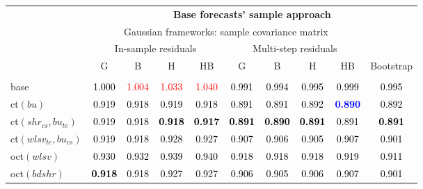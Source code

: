 
\begin{tabular}[t]{>{\centering\arraybackslash}m{2.5cm}ccccccccc}
\toprule
\multicolumn{1}{c}{\textbf{}} & \multicolumn{9}{c}{\textbf{Base forecasts' sample approach}} \\
\cmidrule(l{0pt}r{0pt}){2-10}
\multicolumn{1}{c}{} & \multicolumn{8}{c}{Gaussian frameworks: sample covariance matrix} & \multicolumn{1}{c}{} \\
\multicolumn{1}{c}{} & \multicolumn{4}{c}{In-sample residuals} & \multicolumn{4}{c}{Multi-step residuals} & \multicolumn{1}{c}{} \\
\multirow{-5}{*}{\parbox{2cm}{\centering\textbf{Reconciliation\\approach}}} & G & B & H & HB & G & B & H & HB & \multirow{-4}{*}{Bootstrap}\\
\midrule
\addlinespace[0.3em]
\multicolumn{10}{c}{\textbf{$\forall k \in \{2,1\}$}}\\
base & \textcolor{black}{1.000} & \textcolor{red}{1.004} & \textcolor{red}{1.033} & \textcolor{red}{1.040} & \textcolor{black}{0.991} & \textcolor{black}{0.994} & \textcolor{black}{0.995} & \textcolor{black}{0.999} & \textcolor{black}{0.995}\\
ct$(bu)$ & \textcolor{black}{0.919} & \textcolor{black}{0.918} & \textcolor{black}{0.919} & \textcolor{black}{0.918} & \textcolor{black}{0.891} & \textcolor{black}{0.891} & \textcolor{black}{0.892} & \textcolor{blue}{\textbf{0.890}} & \textcolor{black}{0.892}\\
ct$(shr_{cs}, bu_{te})$ & \textcolor{black}{0.919} & \textcolor{black}{0.918} & \textcolor{black}{\textbf{0.918}} & \textcolor{black}{\textbf{0.917}} & \textcolor{black}{\textbf{0.891}} & \textcolor{black}{\textbf{0.890}} & \textcolor{black}{\textbf{0.891}} & \textcolor{black}{0.891} & \textcolor{black}{\textbf{0.891}}\\
ct$(wlsv_{te}, bu_{cs})$ & \textcolor{black}{0.919} & \textcolor{black}{0.918} & \textcolor{black}{0.928} & \textcolor{black}{0.927} & \textcolor{black}{0.907} & \textcolor{black}{0.906} & \textcolor{black}{0.905} & \textcolor{black}{0.907} & \textcolor{black}{0.901}\\
oct$(wlsv)$ & \textcolor{black}{0.930} & \textcolor{black}{0.932} & \textcolor{black}{0.939} & \textcolor{black}{0.940} & \textcolor{black}{0.918} & \textcolor{black}{0.918} & \textcolor{black}{0.918} & \textcolor{black}{0.919} & \textcolor{black}{0.911}\\
oct$(bdshr)$ & \textcolor{black}{\textbf{0.918}} & \textcolor{black}{0.918} & \textcolor{black}{0.927} & \textcolor{black}{0.927} & \textcolor{black}{0.906} & \textcolor{black}{0.905} & \textcolor{black}{0.906} & \textcolor{black}{0.907} & \textcolor{black}{0.901}\\

\end{tabular}
